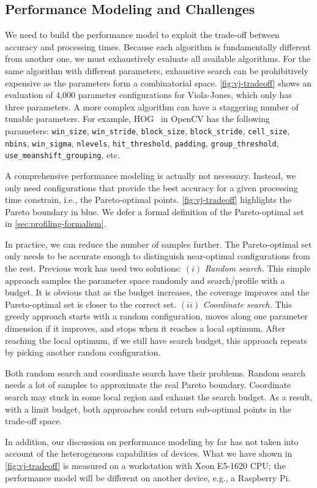 
\subsection{Performance Modeling and Challenges}
\label{sec:perf-model-chall}

We need to build the performance model to exploit the trade-off between accuracy
and processing times. Because each algorithm is fundamentally different from
another one, we must exhaustively evaluate all available algorithms. For the
same algorithm with different parameters, exhaustive search can be prohibitively
expensive as the parameters form a combinatorial
space. \autoref{fig:vj-tradeoff} shows an evaluation of 4,000 parameter
configurations for Viola-Jones, which only has three parameters. A more complex
algorithm can have a staggering number of tunable parameters. For example,
HOG~\cite{dalal2005histograms} in OpenCV has the following parameters:
\texttt{win\_size}, \texttt{win\_stride}, \texttt{block\_size},
\texttt{block\_stride}, \texttt{cell\_size}, \texttt{nbins},
\texttt{win\_sigma}, \texttt{nlevels}, \texttt{hit\_threshold},
\texttt{padding}, \texttt{group\_threshold}, \texttt{use\_meanshift\_grouping},
etc.

A comprehensive performance modeling is actually not necessary. Instead, we only
need configurations that provide the best accuracy for a given processing time
constrain, i.e., the Pareto-optimal points. \autoref{fig:vj-tradeoff} highlights
the Pareto boundary in blue. We defer a formal definition of the Pareto-optimal
set in \autoref{sec:profiling-formalism}.

In practice, we can reduce the number of samples further. The Pareto-optimal set
only needs to be accurate enough to distinguish near-optimal configurations from
the rest. Previous work has used two solutions: $(i)$ \textit{Random search.}
This simple approach samples the parameter space randomly and search/profile
with a budget. It is obvious that as the budget increases, the coverage improves
and the Pareto-optimal set is closer to the correct set. $(ii)$
\textit{Coordinate search.} This greedy approach starts with a random
configuration, moves along one parameter dimension if it improves, and stops
when it reaches a local optimum. After reaching the local optimum, if we still
have search budget, this approach repeats by picking another random
configuration.

Both random search and coordinate search have their problems. Random search
needs a lot of samples to approximate the real Pareto boundary. Coordinate
search may stuck in some local region and exhaust the search budget. As a
result, with a limit budget, both approaches could return sub-optimal points in
the trade-off space.

In addition, our discussion on performance modeling by far has not taken into
account of the heterogeneous capabilities of devices. What we have shown in
\autoref{fig:vj-tradeoff} is measured on a workstation with Xeon E5-1620 CPU;
the performance model will be different on another device, e.g., a Raspberry Pi.

